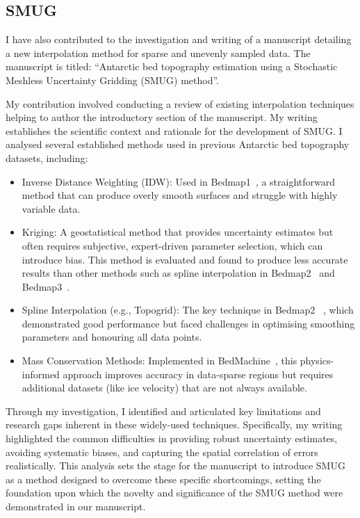 \subsection{SMUG}
I have also contributed to the investigation and writing of a manuscript detailing a new interpolation method for sparse and unevenly sampled data. The manuscript is titled: ``Antarctic bed topography estimation using a Stochastic Meshless Uncertainty Gridding (SMUG) method''. 

My contribution involved conducting a review of existing interpolation techniques helping to author the introductory section of the manuscript. My writing establishes the scientific context and rationale for the development of SMUG. I analysed several established methods used in previous Antarctic bed topography datasets, including:

\begin{itemize}
    \item{Inverse Distance Weighting (IDW)}: Used in Bedmap1~\cite{Lythe_2001}, a straightforward method that can produce overly smooth surfaces and struggle with highly variable data.

    \item{Kriging}: A geostatistical method that provides uncertainty estimates but often requires subjective, expert-driven parameter selection, which can introduce bias. This method is evaluated and found to produce less accurate results than other methods such as spline interpolation in Bedmap2~\cite{Fretwell_2013} and Bedmap3~\cite{Pritchard_2025}.

    \item{Spline Interpolation (e.g., Topogrid)}: The key technique in Bedmap2~\cite{Fretwell_2013} , which demonstrated good performance but faced challenges in optimising smoothing parameters and honouring all data points.

    \item{Mass Conservation Methods}: Implemented in BedMachine~\cite{Morlighem_2020}, this physics-informed approach improves accuracy in data-sparse regions but requires additional datasets (like ice velocity) that are not always available.
\end{itemize}

Through my investigation, I identified and articulated key limitations and research gaps inherent in these widely-used techniques. Specifically, my writing highlighted the common difficulties in providing robust uncertainty estimates, avoiding systematic biases, and capturing the spatial correlation of errors realistically. This analysis sets the stage for the manuscript to introduce SMUG as a method designed to overcome these specific shortcomings, setting the foundation upon which the novelty and significance of the SMUG method were demonstrated in our manuscript. %

